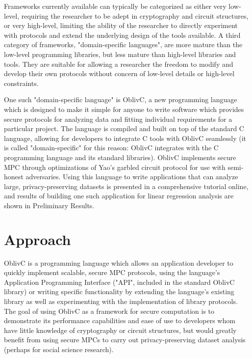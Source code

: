 \documentclass[conference]{IEEEtran}
\begin{document}
Frameworks currently available can typically be categorized as either very low-level, requiring the researcher to be adept in cryptography and circuit structures, or very high-level, limiting the ability of the researcher to directly experiment with protocols 
and extend the underlying design of the tools available.
A third category of frameworks, "domain-specific languages", are more mature than
the low-level programming libraries, but less mature than high-level libraries and tools\cite{cryptoeprint:2015:1039}.
They are suitable for allowing a researcher the freedom to modify and develop
their own protocols without concern of low-level details or high-level constraints.

One such "domain-specific language" is OblivC, a new programming language 
which is designed to make it simple for anyone to write software which provides 
secure protocols for analyzing data and fitting individual requirements 
for a particular project\cite{cryptoeprint:2015:1153}. The language is compiled and built 
on top of the standard C language, allowing for developers to 
integrate C tools with OblivC seamlessly (it is called "domain-specific" for 
this reason: OblivC integrates with the C programming language and its standard libraries).
OblivC implements secure MPC through optimizations of Yao's garbled circuit protocol for use with semi-honest adversaries.
Using this language to write applications that can analyze large, privacy-preserving
datasets is presented in a comprehensive tutorial online\cite{tutorial:oblivc}, and results of building one such application for linear regression analysis 
are shown in Preliminary Results.

\section{Approach}
OblivC is a programming language which allows an application developer to
quickly implement scalable, secure MPC protocols, using the language’s 
Application Programming Interface ("API", included in the standard OblivC
library) or writing specific functionality by extending the language's existing library as
well as experimenting with the implementation of library protocols.
The goal of using OblivC as a framework for secure computation is to demonstrate 
its performance capabilities and ease of use to developers whom have little 
knowledge of cryptography or circuit structures, but would greatly benefit from 
using secure MPCs to carry out privacy-preserving dataset analysis (perhaps for
social science research).
\end{document}

